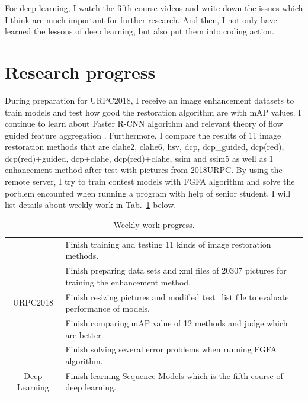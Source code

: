 \documentclass[a4paper]{article}
\begin{document}
For deep learning, I watch the fifth course videos and write down the issues which I think are much important for further research. And then, I not only have learned the lessons of deep learning, but also put them into coding action. 


\section{Research progress}

During preparation for URPC2018, I receive an image enhancement datasets to train models and test how good the restoration algorithm are with mAP values. I continue to learn about Faster R-CNN algorithm \cite{Ren2015Faster} and relevant theory of flow guided feature aggregation \cite{zhu17fgfa}. Furthermore, I compare the results of 11 image restoration methods that are clahe2, clahe6, hsv, dcp, dcp\_guided, dcp(red), dcp(red)+guided, dcp+clahe, dcp(red)+clahe, ssim and ssim5 as well as 1 enhancement method after test with pictures from 2018URPC. By using the remote server, I try to train contest models with FGFA algorithm and solve the porblem encounted when running a program with help of senior student. I will list details about weekly work in Tab.~\ref{t1} below.

\begin{table}[hb]
	\centering
	\caption{Weekly work progress.}
	\begin{tabular}{c|p{10cm}}
		\hline 
		& Finish training and testing 11 kinds of image restoration methods.\\
		
		& Finish preparing data sets and xml files of 20307 pictures for training the enhancement method. \\
		
		URPC2018 & Finish resizing pictures and modified test\_list file to evaluate performance of models.\\
		
		& Finish comparing mAP value of 12 methods and judge which are better.\\
		
		& Finish solving several error problems when running FGFA algorithm.\\
		\hline
		Deep Learning& Finish learning Sequence Models which is the fifth course of deep learning.\\
		\hline
	\end{tabular}
	\label{t1}
\end{table} 
\end{document}
